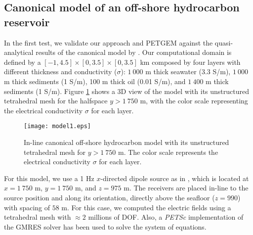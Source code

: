 \documentclass[review]{elsarticle}
\begin{document}
\subsection{Canonical model of an off-shore hydrocarbon reservoir}
\label{DIPOLE1D_test}
In the first test, we validate our approach and PETGEM  against the quasi-analytical results of the canonical model by \citet{Weiss2006a}. Our computational domain is defined by a $[-1,4.5]\times[0,3.5]\times[0,3.5]$ km composed by four layers with different thickness and conductivity ($\sigma$): $1\:000$ m thick seawater (3.3 S/m), $1\:000$ m thick sediments (1 S/m), 100 m thick oil (0.01 S/m), and $1\:400$ m thick sediments (1 S/m). Figure \ref{fig:model1} shows a 3D view of the model with its unstructured tetrahedral mesh for the halfspace $y>1\:750$ m, with the color scale representing the electrical conductivity $\sigma$ for each layer.
\begin{figure}[!htbp]
	\centering
	\texttt{[image: model1.eps]}
	\caption{In-line canonical off-shore hydrocarbon model with its unstructured tetrahedral mesh for $y>1\:750$ m. The color scale represents the electrical conductivity $\sigma$ for each layer.}
	\label{fig:model1}
\end{figure}
For this model, we use a 1 Hz $x$-directed dipole source as in \citet{Castillo2015b}, which is located at $x=1\:750$ m, $y=1\:750$ m, and $z=975$ m. The receivers are placed in-line to the source position and along its orientation, directly above the seafloor ($z = 990$) with spacing of $58$ m. For this case, we computed the electric fields using a tetrahedral mesh with $\approx2$ millions of DOF. Also, a \textit{PETSc} implementation of the GMRES solver has been used to solve the system of equations.
\end{document}
